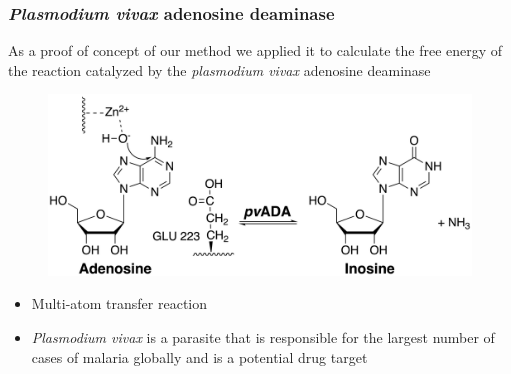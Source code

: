 \documentclass{beamer}
\begin{document}
\begin{frame}
\frametitle{\textit{Plasmodium vivax} adenosine deaminase}
As a proof of concept of our method we applied it to calculate the free energy of the reaction catalyzed by
the \emph{plasmodium vivax} adenosine deaminase
\begin{figure}
\includegraphics[scale=0.6]{figures/ada-reaction.png}
\end{figure}
\begin{itemize}
\item Multi-atom transfer reaction
\item \textit{Plasmodium vivax} is a parasite that is responsible for the largest number of cases of
malaria globally and is a potential drug target
\end{itemize}
\end{frame}
\end{document}

